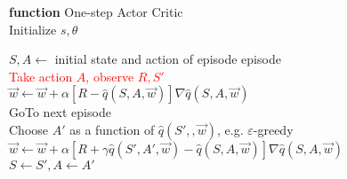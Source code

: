 \documentclass{standalone}
\begin{document}
\pagestyle{empty}
\begin{algorithm}[H]
  \textbf{function} One-step Actor Critic \\
  	Initialize $s, \theta$ \\

  	 {
	$S,A \leftarrow$ initial state and action of episode
	episode\\
   {
  	\textcolor{red}{Take action $A$, observe $R, S'$}\\
  	 {
  		$\vec{w} \leftarrow \vec{w} + \alpha [R-\hat{q}(S,A,\vec{w})]\nabla\hat{q}(S,A,\vec{w})$\\
  		GoTo next episode\\
  	} 
  	Choose $A'$ as a function of $\hat{q}(S', ,\vec{w})$, e.g. $\varepsilon$-greedy\\
  	$\vec{w} \leftarrow \vec{w} + \alpha [R + \gamma \hat{q}(S',A',\vec{w}) -\hat{q}(S,A,\vec{w})]\nabla\hat{q}(S,A,\vec{w})$\\
  	$S \leftarrow S', A \leftarrow A'$
  }
  
}

\end{algorithm}
\end{document}
